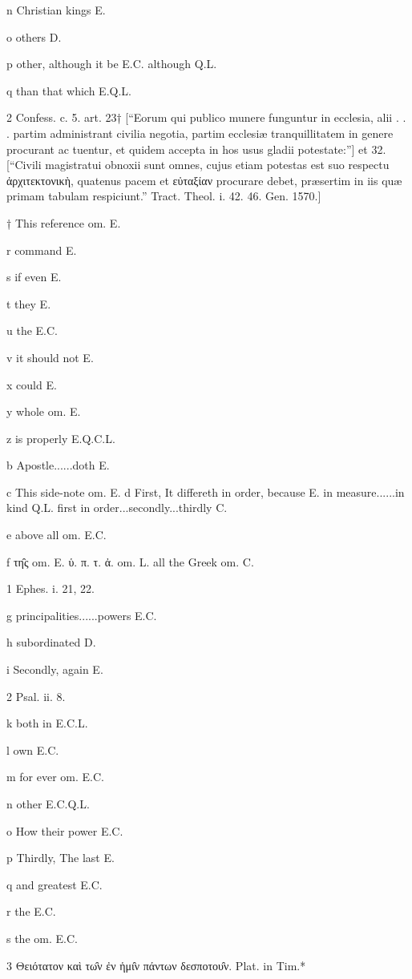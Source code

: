 n
Christian kings E.

o
others D.

p
other, although it be E.C. although Q.L.

q
than that which E.Q.L.

2
Confess. c. 5. art. 23† [“Eorum qui publico munere funguntur in ecclesia, alii . . . partim administrant civilia negotia, partim ecclesiæ tranquillitatem in genere procurant ac tuentur, et quidem accepta in hos usus gladii potestate:”] et 32. [“Civili magistratui obnoxii sunt omnes, cujus etiam potestas est suo respectu ἀρχιτεκτονικὴ, quatenus pacem et εὐταξίαν procurare debet, præsertim in iis quæ primam tabulam respiciunt.” Tract. Theol. i. 42. 46. Gen. 1570.]

†
This reference om. E.

r
command E.

s
if even E.

t
they E.

u
the E.C.

v
it should not E.

x
could E.

y
whole om. E.

z
is properly E.Q.C.L.

b
Apostle......doth E.

c This side-note om. E.
d
First, It differeth in order, because E. in measure......in kind Q.L. first in order...secondly...thirdly C.

e
above all om. E.C.

f
τη̑ς om. E. ὑ. π. τ. ἀ. om. L. all the Greek om. C.

1
Ephes. i. 21, 22.

g
principalities......powers E.C.

h
subordinated D.

i
Secondly, again E.

2
Psal. ii. 8.

k
both in E.C.L.

l
own E.C.

m
for ever om. E.C.

n
other E.C.Q.L.

o
How their power E.C.

p
Thirdly, The last E.

q
and greatest E.C.

r
the E.C.

s
the om. E.C.

3
Θειότατον καὶ τω̑ν ἐν ἡμι̑ν πάντων δεσποτου̑ν. Plat. in Tim.*

